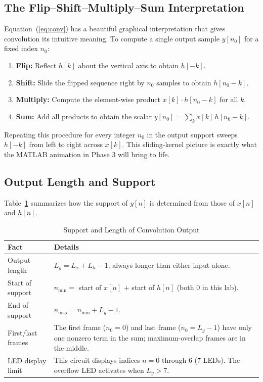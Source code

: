 \documentclass[11pt,letterpaper]{article}
\begin{document}
\subsection{The Flip--Shift--Multiply--Sum Interpretation}

Equation~(\ref{eq:conv}) has a beautiful graphical interpretation that gives convolution its intuitive meaning. To compute a single output sample $y[n_0]$ for a fixed index $n_0$:

\begin{enumerate}
    \item \textbf{Flip:} Reflect $h[k]$ about the vertical axis to obtain $h[-k]$.
    \item \textbf{Shift:} Slide the flipped sequence right by $n_0$ samples to obtain $h[n_0 - k]$.
    \item \textbf{Multiply:} Compute the element-wise product $x[k] \cdot h[n_0 - k]$ for all $k$.
    \item \textbf{Sum:} Add all products to obtain the scalar $y[n_0] = \sum_{k} x[k]\,h[n_0 - k]$.
\end{enumerate}

Repeating this procedure for every integer $n_0$ in the output support sweeps $h[-k]$ from left to right across $x[k]$. This sliding-kernel picture is exactly what the MATLAB animation in Phase 3 will bring to life.

\subsection{Output Length and Support}

Table~\ref{tab:support} summarizes how the support of $y[n]$ is determined from those of $x[n]$ and $h[n]$.

\begin{table}[H]
    \centering
    \caption{Support and Length of Convolution Output}
    \label{tab:support}
    \begin{tabularx}{\linewidth}{l X}
    \toprule
    \textbf{Fact} & \textbf{Details}\\
    \midrule
    Output length     & $L_y = L_x + L_h - 1$; always longer than either input alone.\\
    Start of support  & $n_{\min} = $ start of $x[n]$ $+$ start of $h[n]$ (both 0 in this lab).\\
    End of support    & $n_{\max} = n_{\min} + L_y - 1$.\\
    First/last frames & The first frame ($n_0 = 0$) and last frame ($n_0 = L_y - 1$) have only one nonzero term in the sum; maximum-overlap frames are in the middle.\\
    LED display limit & This circuit displays indices $n = 0$ through $6$ (7 LEDs). The overflow LED activates when $L_y > 7$.\\
    \bottomrule
    \end{tabularx}
\end{table}
\end{document}
